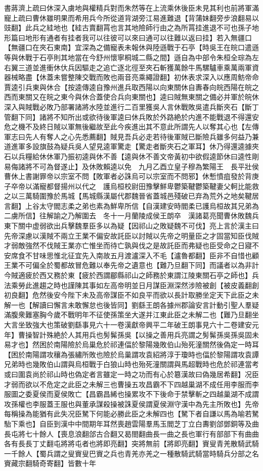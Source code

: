 書蔣濟上疏曰休深入虜地與權精兵對而朱然等在上流乘休後臣未見其利也前將軍滿寵上疏曰曹休雖明果而希用兵今所從道背湖旁江易進難退【背蒲妹翻旁步浪翻易以豉翻】此兵之絓地也【絓古賣翻罥也言其地險師行由之為所罥挂進退不可也孫子地形篇曰地形有通者有挂者我可以往彼可以來曰通可以往難以返曰挂】若入無疆口【無疆口在夾石東南】宜深為之備寵表未報休與陸遜戰于石亭【時吳王在皖口遣遜等與休戰于石亭則其地當在今舒州懷寧桐城二縣之間】遜自為中部令朱桓全琮為左右翼三道並進衝休㐲兵因驅走之追亡逐北徑至夾石斬獲萬餘牛馬騾驢車乘萬兩軍資器械略盡【休蓋未嘗整陳交戰而敗也兩音亮乘繩證翻】初休表求深入以應周魴帝命賈逵引兵東與休合【按逵傳逵自豫州進兵取西陽以向東關休自夀春向皖西陽在皖之西而東關又在皖之東今與休合蓋使合兵向東關也】逵曰賊無東關之備必并軍於皖休深入與賊戰必敗乃部署諸將水陸並進行二百里獲吳人言休戰敗吳遣兵斷夾石【斷丁管翻下同】諸將不知所出或欲待後軍逵曰休兵敗於外路絶於内進不能戰退不得還安危之機不及終日賊以軍無後繼故至此今疾進出其不意此所謂先人以奪其心也【左傳軍志曰先人有奪人之心先悉薦翻】賊見吾兵必走若待後軍賊已斷險兵雖多何益乃兼道進軍多設旗鼓為疑兵吳人望見逵軍驚走【驚走者斷夾石之軍耳】休乃得還逵據夾石以兵糧給休休軍乃振初逵與休不善【逵與休不善文帝黃初中欲假逵節休曰逵性剛易侮諸將不可為督遂止】及休敗賴逵以免　九月乙酉立皇子穆為繁陽王　長平壯侯曹休上書謝罪帝以宗室不問【敗軍者必誅烏可以宗室而不問邪】休慙憤疽發於背庚子卒帝以滿寵都督揚州以代之　護烏桓校尉田豫擊鮮卑鬱築鞬鬱築鞬妻父軻比能救之以三萬騎圍豫於馬城【馬城縣漢屬代郡魏晉省蓋城邑殘破已弃為荒外之地矣鞬居言翻】上谷太守閻志柔之弟也素為鮮卑所信【自漢建安時閻柔已護烏桓故其兄弟為二虜所信】往解諭之乃解圍去　冬十一月蘭陵成侯王朗卒　漢諸葛亮聞曹休敗魏兵東下關中虚弱欲出兵擊魏羣臣多以為疑【因祁山之敗疑魏不可伐】亮上言於漢主曰先帝深慮以漢賊不兩立王業不偏安故託臣以討賊以先帝之明量臣之才固當知臣伐賊才弱敵強然不伐賊王業亦亡惟坐而待亡孰與伐之是故託臣而弗疑也臣受命之日寢不安席食不甘味思惟北征宜先入南故五月渡瀘深入不毛【瀘魯都翻】臣非不自惜也顧王業不可偏全於蜀都故冒危難以奉先帝之遺意也【難乃旦翻下同】而議者以為非計今賊適疲於西又務於東【疲於西謂郿縣祁山之師務於東謂江陵東關石亭之師也】兵法乘勞此進趨之時也謹陳其事如左高帝明並日月謀臣淵深然涉險被創【被皮義翻創初良翻】危然後安今陛下未及高帝謀臣不如良平而欲以長計取勝坐定天下此臣之未解一也【解讀曰懈言未敢懈怠也後皆同】劉繇王朗各據州郡論安言計動引聖人羣疑滿腹衆難塞胸今歲不戰明年不征使孫策坐大遂并江東此臣之未解二也【難乃旦翻坐大言坐致強大也策破劉繇事見六十一卷漢獻帝興平二年破王朗事見六十二卷建安元年】曹操智計殊絶於人其用兵也髣髴孫吳【以操之善用兵亮謂之髣髴孫吳孫吳固未易才也】然困於南陽險於烏巢危於祁連偪於黎陽幾敗伯山殆死潼關然後偽定一時耳【困於南陽謂攻穰為張繡所敗也險於烏巢謂攻袁紹將淳于瓊時也偪於黎陽謂攻袁譚兄弟時也幾敗伯山謂與烏桓戰于白狼山時也殆死潼關謂與馬超戰時也危於祁連當考或曰圍袁尚於祁山時也偽定者言雖定一時之功而有心於簒漢故曰偽幾居希翻】况臣才弱而欲以不危定之此臣之未解三也曹操五攻昌霸不下四越巢湖不成任用李服而李服圖之委夏侯而夏侯敗亡【昌霸昌絺也操累攻不下後命于禁擊斬之四越巢湖不成謂攻孫權也李服蓋王服也與董承謀殺操被誅夏侯謂夏侯淵守漢中為先主所敗也】先帝每稱操為能猶有此失况臣駑下何能必勝此臣之未解四也【駑下者自謙以馬為喻若駑駘下乘也】自臣到漢中中間期年耳然喪趙雲陽羣馬玉閻芝丁立白夀劉郃鄧銅等及曲長屯將七十餘人【喪息浪翻郃古合翻又曷閤翻曲長一曲之長也軍行有部部下有曲曲各有長長丁丈翻屯將將屯者也將即亮翻】突將無前【將即亮翻】賨叟青羌散騎武騎一千餘人【蜀兵謂之叟賨叟巴賨之兵也青羌亦羌之一種散騎武騎當時騎兵分部之名賨藏宗翻騎奇寄翻】皆數十年